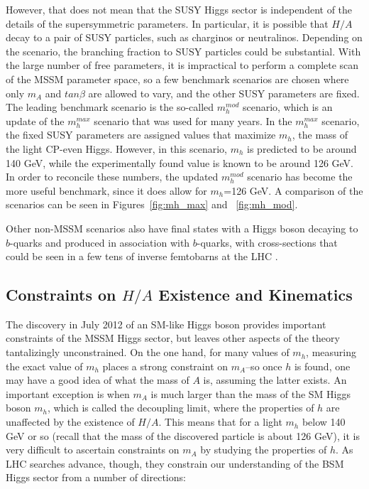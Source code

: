 However, that does not mean that the SUSY Higgs sector is 
independent of the details of the supersymmetric parameters.  In particular, 
it is possible that $H/A$ decay to a pair of 
SUSY particles, such as charginos or neutralinos.  Depending on the 
scenario, the branching fraction to SUSY particles could be substantial.  
With the large number of free parameters, it is impractical to 
perform a complete scan of the MSSM parameter space, so a 
few benchmark scenarios are chosen where only $m_A$ 
and $tan\beta$ are allowed to vary, and 
the other SUSY parameters are fixed.  The leading benchmark scenario is 
the so-called $m_h^{mod}$ scenario, 
which is an update of the $m_h^{max}$ 
scenario that was used for many years.  In the $m_h^{max}$ 
scenario, the fixed SUSY parameters are assigned values that maximize $m_h$, 
the mass of the light CP-even Higgs.  However, 
in this scenario, $m_h$ is predicted to 
be around 140 GeV, while the experimentally found value is known 
to be around 126 GeV.  In order to reconcile these numbers, 
the updated $m_h^{mod}$ scenario has become 
the more useful benchmark, since it does allow for $m_h$=126 GeV.  
A comparison of the scenarios can be seen in Figures~\ref{fig:mh_max} and ~\ref{fig:mh_mod}.

Other non-MSSM scenarios also have final states with a Higgs boson
decaying to $b$-quarks and produced in association with $b$-quarks,
with cross-sections that could be seen in a few tens of inverse 
femtobarns at the LHC \cite{Gori}.   









\subsection{Constraints on $H/A$ Existence and Kinematics}
The discovery in July 2012 of an SM-like Higgs boson provides important constraints of the MSSM Higgs sector,
 but leaves other aspects of the theory tantalizingly unconstrained.  On the one hand, 
for many values of $m_h$, measuring the exact value of $m_h$ 
places a strong constraint on $m_A$--so once $h$ is found, one may have a good idea of what the mass of 
$A$ is, assuming the latter exists.  An important exception is when 
$m_A$ is much larger than the mass of the SM Higgs 
boson $m_h$, which is called the decoupling limit, where the 
properties of $h$ are unaffected by the existence of $H/A$.
  This means that for a light $m_h$ below 140 GeV 
or so (recall that the mass of the discovered particle is about 126 GeV),
 it is very difficult to ascertain constraints on $m_A$ by studying the properties of $h$.  
 As LHC searches advance, though, they constrain our understanding of the BSM 
 Higgs sector from a number of directions: 

